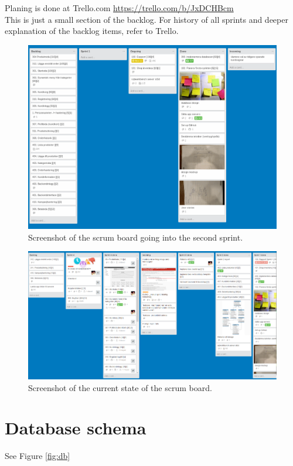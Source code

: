\documentclass[paper=a4, fontsize=11pt]{report} %
\begin{document}
	Planing is done at Trello.com
	\url{https://trello.com/b/JxDCHBcm} \\
	This is just a small section of the backlog. For history of all sprints and deeper
	explanation of the backlog items, refer to Trello.


	\begin{figure}[h]
		\includegraphics[width=\textwidth]{artifacts/trello_sprint1.png}
		\caption{Screenshot of the scrum board going into the second sprint.}
		\label{fig:trello_sprint1}
	\end{figure}

	\begin{figure}[h]
		\includegraphics[width=\textwidth]{artifacts/trello_final.png}
		\caption{Screenshot of the current state of the scrum board.}
		\label{fig:trello_final}
	\end{figure}

\section*{Database schema}
See Figure \ref{fig:db}
\end{document}
